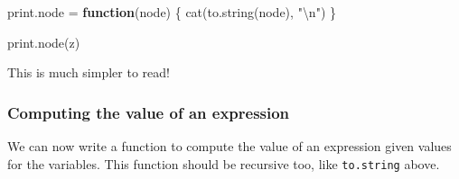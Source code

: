 \documentclass[
  a4paper,
]{article}
\newenvironment{Shaded}{\begin{snugshade}}{\end{snugshade}}
\newcommand{\ControlFlowTok}[1]{\textcolor[rgb]{0.13,0.29,0.53}{\textbf{#1}}}
\newcommand{\FunctionTok}[1]{\textcolor[rgb]{0.00,0.00,0.00}{#1}}
\newcommand{\NormalTok}[1]{#1}
\newcommand{\OtherTok}[1]{\textcolor[rgb]{0.56,0.35,0.01}{#1}}
\newcommand{\SpecialCharTok}[1]{\textcolor[rgb]{0.00,0.00,0.00}{#1}}
\newcommand{\StringTok}[1]{\textcolor[rgb]{0.31,0.60,0.02}{#1}}
\begin{document}
\begin{Shaded}
\begin{Highlighting}[]
\NormalTok{print.node }\OtherTok{=} \ControlFlowTok{function}\NormalTok{(node) \{}
  \FunctionTok{cat}\NormalTok{(}\FunctionTok{to.string}\NormalTok{(node), }\StringTok{"}\SpecialCharTok{\textbackslash{}n}\StringTok{"}\NormalTok{)}
\NormalTok{\}}

\FunctionTok{print.node}\NormalTok{(z)}
\end{Highlighting}
\end{Shaded}

This is much simpler to read!

\hypertarget{computing-the-value-of-an-expression}{%
\subsubsection{Computing the value of an
expression}\label{computing-the-value-of-an-expression}}

We can now write a function to compute the value of an expression given
values for the variables. This function should be recursive too, like
\texttt{to.string} above.
\end{document}
